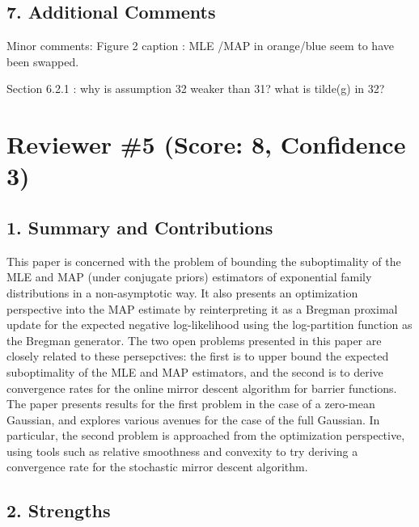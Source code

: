 \subsection*{7. Additional Comments}

Minor comments:
Figure 2 caption : MLE /MAP in orange/blue seem to have been swapped.

Section 6.2.1 : why is assumption 32 weaker than 31? what is tilde(g) in 32?






















\newpage
\section*{Reviewer \#5 (Score: 8, Confidence 3)}

\subsection*{1. Summary and Contributions}

This paper is concerned with the problem of bounding the suboptimality of the MLE
and MAP (under conjugate priors) estimators of exponential family
distributions in a non-asymptotic way. It also presents an optimization
perspective into the MAP estimate by reinterpreting it as a Bregman proximal
update for the expected negative log-likelihood using the log-partition
function as the Bregman generator. The two open problems presented in this
paper are closely related to these persepctives: the first is to upper bound
the expected suboptimality of the MLE and MAP estimators, and the second is to
derive convergence rates for the online mirror descent algorithm for barrier
functions. The paper presents results for the first problem in the case of
a zero-mean Gaussian, and explores various avenues for the case of
the full Gaussian. In particular, the second problem is approached from the
optimization perspective, using tools such as relative smoothness and
convexity to try deriving a convergence rate for the stochastic mirror descent
algorithm.

\subsection*{2. Strengths}

